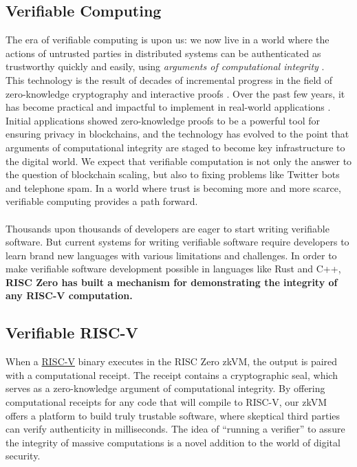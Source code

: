 \documentclass[10pt,letterpaper,titlepage]{article}
\theoremstyle{definition}
\begin{document}
\subsection{Verifiable Computing}
The era of verifiable computing is upon us: we now live in a world where the actions of untrusted parties in distributed systems can be authenticated as trustworthy quickly and easily, using \textit{arguments of computational integrity} \cite{stark}. \\
This technology is the result of decades of incremental progress in the field of zero-knowledge cryptography and interactive proofs \cite{zkp,pcp,iop}.
Over the past few years, it has become practical and impactful to implement in real-world applications \cite{zcash,ethSTARK}.
Initial applications showed zero-knowledge proofs to be a powerful tool for ensuring privacy in blockchains, and the technology has evolved to the point that arguments of computational integrity are staged to become key infrastructure to the digital world.
We expect that verifiable computation is not only the answer to the question of blockchain scaling, but also to fixing problems like Twitter bots and telephone spam.
In a world where trust is becoming more and more scarce, verifiable computing provides a path forward. \\
\\
Thousands upon thousands of developers are eager to start writing verifiable software.
But current systems for writing verifiable software require developers to learn brand new languages with various limitations and challenges.
In order to make verifiable software development possible in languages like Rust and C++, \textbf{RISC Zero has built a mechanism for demonstrating the integrity of any RISC-V computation.}

\subsection{Verifiable RISC-V}
When a \href{https://riscv.org/} {RISC-V} binary executes in the RISC Zero zkVM, the output is paired with a computational receipt.
The receipt contains a cryptographic seal, which serves as a zero-knowledge argument of computational integrity.
By offering computational receipts for any code that will compile to RISC-V, our zkVM offers a platform to build truly trustable software, where skeptical third parties can verify authenticity in milliseconds. The idea of ``running a verifier'' to assure the integrity of massive computations is a novel addition to the world of digital security.
\end{document}
